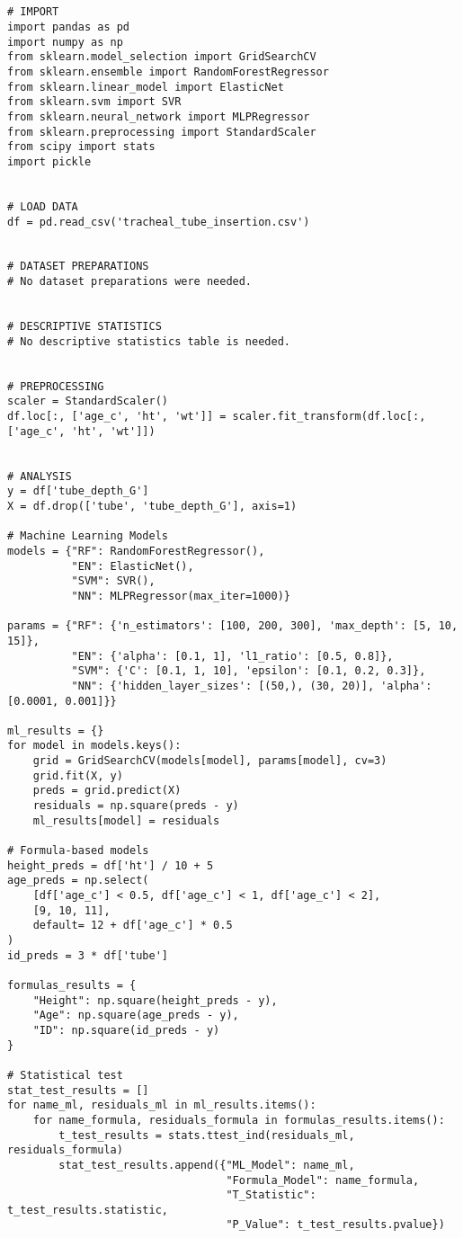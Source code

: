 \documentclass[11pt]{article}
\begin{document}
\begin{verbatim}


# IMPORT
import pandas as pd
import numpy as np
from sklearn.model_selection import GridSearchCV
from sklearn.ensemble import RandomForestRegressor
from sklearn.linear_model import ElasticNet
from sklearn.svm import SVR
from sklearn.neural_network import MLPRegressor
from sklearn.preprocessing import StandardScaler
from scipy import stats
import pickle


# LOAD DATA
df = pd.read_csv('tracheal_tube_insertion.csv')


# DATASET PREPARATIONS
# No dataset preparations were needed.


# DESCRIPTIVE STATISTICS
# No descriptive statistics table is needed.


# PREPROCESSING
scaler = StandardScaler()
df.loc[:, ['age_c', 'ht', 'wt']] = scaler.fit_transform(df.loc[:, ['age_c', 'ht', 'wt']])


# ANALYSIS
y = df['tube_depth_G']
X = df.drop(['tube', 'tube_depth_G'], axis=1)

# Machine Learning Models
models = {"RF": RandomForestRegressor(),
          "EN": ElasticNet(),
          "SVM": SVR(),
          "NN": MLPRegressor(max_iter=1000)}

params = {"RF": {'n_estimators': [100, 200, 300], 'max_depth': [5, 10, 15]},
          "EN": {'alpha': [0.1, 1], 'l1_ratio': [0.5, 0.8]},
          "SVM": {'C': [0.1, 1, 10], 'epsilon': [0.1, 0.2, 0.3]},
          "NN": {'hidden_layer_sizes': [(50,), (30, 20)], 'alpha': [0.0001, 0.001]}}

ml_results = {}
for model in models.keys():
    grid = GridSearchCV(models[model], params[model], cv=3)
    grid.fit(X, y)
    preds = grid.predict(X)
    residuals = np.square(preds - y)
    ml_results[model] = residuals
    
# Formula-based models
height_preds = df['ht'] / 10 + 5
age_preds = np.select(
    [df['age_c'] < 0.5, df['age_c'] < 1, df['age_c'] < 2],
    [9, 10, 11],
    default= 12 + df['age_c'] * 0.5
)
id_preds = 3 * df['tube']

formulas_results = {
    "Height": np.square(height_preds - y),
    "Age": np.square(age_preds - y),
    "ID": np.square(id_preds - y)
}

# Statistical test
stat_test_results = []
for name_ml, residuals_ml in ml_results.items():
    for name_formula, residuals_formula in formulas_results.items():
        t_test_results = stats.ttest_ind(residuals_ml, residuals_formula)
        stat_test_results.append({"ML_Model": name_ml,
                                  "Formula_Model": name_formula,
                                  "T_Statistic": t_test_results.statistic,
                                  "P_Value": t_test_results.pvalue})


\end{verbatim}
\end{document}
